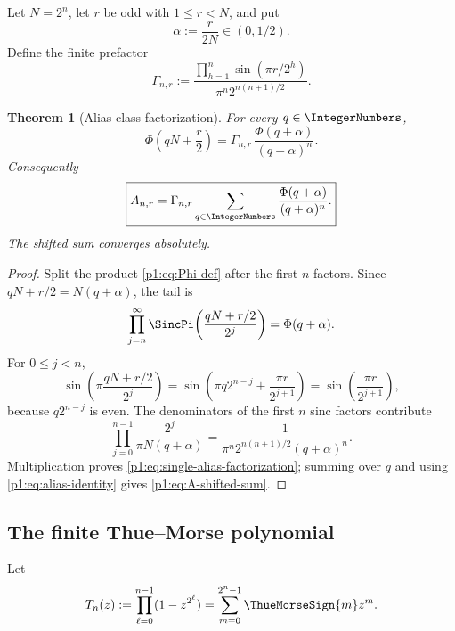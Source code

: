 \documentclass[11pt,oneside]{article}
\newtheorem{theorem}{Theorem}[section]
\theoremstyle{definition}
\theoremstyle{remark}
\newcommand{\PhiU}{\Phi}
\begin{document}
Let $N=2^n$, let $r$ be odd with $1\le r<N$, and put
\begin{equation}\label{p1:eq:a-shift}
 \alpha:=\frac{r}{2N}\in(0,1/2).
\end{equation}
Define the finite prefactor
\begin{equation}\label{p1:eq:Gamma-n-r}
 \Gamma_{n,r}:=
 \frac{\displaystyle\prod_{h=1}^{n}\sin(\pi r/2^h)}
      {\pi^n2^{n(n+1)/2}}.
\end{equation}

\begin{theorem}[Alias-class factorization]\label{p1:thm:alias-factorization}
For every $q\in\IntegerNumbers$,
\begin{equation}\label{p1:eq:single-alias-factorization}
 \PhiU\!\left(qN+\frac r2\right)
 =\Gamma_{n,r}\,
 \frac{\PhiU(q+\alpha)}{(q+\alpha)^n}.
\end{equation}
Consequently
\begin{equation}\label{p1:eq:A-shifted-sum}
 \boxed{
 A_{n,r}=\Gamma_{n,r}
 \sum_{q\in\IntegerNumbers}\frac{\PhiU(q+\alpha)}{(q+\alpha)^n}.}
\end{equation}
The shifted sum converges absolutely.
\end{theorem}

\begin{proof}
Split the product \eqref{p1:eq:Phi-def} after the first $n$ factors.  Since
$qN+r/2=N(q+\alpha)$, the tail is
\[
 \prod_{j=n}^{\infty}
 \SincPi\!\left(\frac{qN+r/2}{2^j}\right)
 =\PhiU(q+\alpha).
\]
For $0\le j<n$,
\[
 \sin\!\left(\pi\frac{qN+r/2}{2^j}\right)
 =\sin\!\left(\pi q2^{n-j}+\frac{\pi r}{2^{j+1}}\right)
 =\sin\!\left(\frac{\pi r}{2^{j+1}}\right),
\]
because $q2^{n-j}$ is even.  The denominators of the first $n$ sinc factors
contribute
\[
 \prod_{j=0}^{n-1}\frac{2^j}{\pi N(q+\alpha)}
 =\frac{1}{\pi^n2^{n(n+1)/2}(q+\alpha)^n}.
\]
Multiplication proves \eqref{p1:eq:single-alias-factorization}; summing over $q$
and using \eqref{p1:eq:alias-identity} gives \eqref{p1:eq:A-shifted-sum}.
\end{proof}

\subsection{The finite Thue--Morse polynomial}

Let
\begin{equation}\label{p1:eq:T-n-polynomial}
 T_n(z):=\prod_{\ell=0}^{n-1}(1-z^{2^\ell})
 =\sum_{m=0}^{2^n-1}\ThueMorseSign{m}z^m.
\end{equation}
\end{document}
